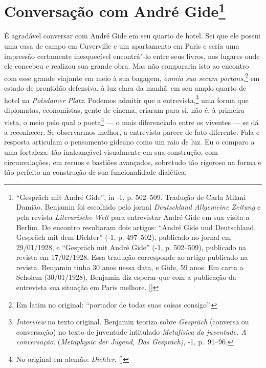 \chapter{Conversação com André Gide\footnote[*]{``Gespräch mit André Gide'', in -1, p. 502--509. Tradução de Carla Milani Damião. Benjamin
  foi escolhido pelo jornal \emph{Deutschland Allgemeine Zeitung} e pela
  revista \emph{Literarische Welt} para entrevistar André Gide em sua
  visita a Berlim. Do encontro resultaram dois artigos: ``André Gide
  und Deutschland. Gespräch mit dem Dichter'' (-1, p. 497--502),
  publicado no jornal em 29/01/1928, e ``Gespräch mit André Gide''
  (-1, p. 502--509), publicado na revista em 17/02/1928. Essa
  tradução corresponde ao artigo publicado na revista. Benjamin tinha 30
  anos nessa data, e Gide, 59 anos. Em carta a Scholem (30/01/1928),
  Benjamin diz esperar que com a publicação da entrevista sua situação
  em Paris melhore. []}}

É agradável conversar com André Gide em seu quarto de hotel. Sei que ele possui uma casa de campo em Cuverville e um
apartamento em Paris e seria uma impressão certamente inesquecível
encontrá"-lo entre seus livros, nos lugares onde ele concebeu e realizou
sua grande obra. Mas não compararia isto ao encontro com esse grande
viajante em meio à sua bagagem, \emph{omnia sua secum portans},\footnote{Em latim no original: ``portador de todas suas coisas consigo''. \versal{[N.~T.]}} em
estado de prontidão defensiva, à luz clara da manhã~em seu amplo quarto
de hotel na \emph{Potsdamer Platz}. Podemos admitir que a entrevista,\footnote{\emph{Interview} no texto original.
  Benjamin teoriza sobre \emph{Gespräch} (conversa ou conversação) no
  texto de juventude intitulado \emph{Metafísica da juventude. A
  conversação}. (\emph{Metaphysic der Jugend, Das Gespräch)},
  -1, p.~91--96. \versal{[N.~T.]}} uma forma que diplomatas, economistas, gente de cinema, criaram
para si, não é, à primeira vista, o meio pelo qual o poeta\footnote{No original em alemão: \emph{Dichter}. []} --- o mais diferenciado entre os viventes --- se dá a
reconhecer. Se observarmos melhor, a entrevista parece de fato
diferente. Fala e resposta articulam o pensamento gideano como um raio
de luz. Eu o comparo a uma fortaleza: tão inalcançável visualmente em
sua construção, com circunvalações, em recuos e bastiões avançados,
sobretudo tão rigoroso na forma e tão perfeito na construção de sua
funcionalidade dialética.

